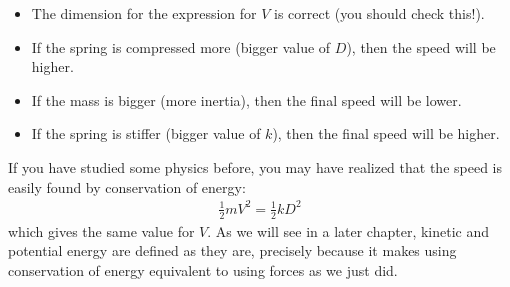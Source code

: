 \begin{example}
\begin{itemize}
\item The dimension for the expression for $V$ is correct (you should check this!).
\item If the spring is compressed more (bigger value of $D$), then the speed will be higher.
\item If the mass is bigger (more inertia), then the final speed will be lower.
\item If the spring is stiffer (bigger value of $k$), then the final speed will be higher.
\end{itemize}
If you have studied some physics before, you may have realized that the speed is easily found by conservation of energy:
\begin{align*}
\frac{1}{2}mV^2=\frac{1}{2}kD^2
\end{align*}
which gives the same value for $V$. As we will see in a later chapter, kinetic and potential energy are defined as they are, precisely because it makes using conservation of energy equivalent to using forces as we just did.
\end{example}

